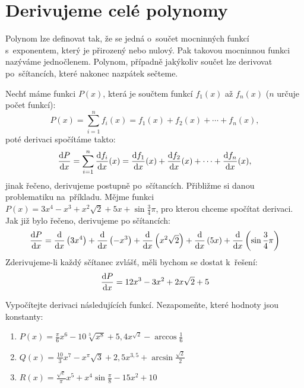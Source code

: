 \section{Derivujeme celé polynomy}
\label{sec:derivace-polynomy}

Polynom lze definovat tak, že se jedná o~součet mocninných funkcí s~exponentem, který
je přirozený nebo nulový. Pak takovou mocninnou funkci nazýváme jednočlenem. Polynom,
případně jakýkoliv součet lze derivovat po~sčítancích, které nakonec nazpátek
sečteme.

Nechť máme funkci $P(x)$, která je součtem funkcí $f_1(x)$ až $f_n(x)$ ($n$ určuje počet funkcí):
\begin{equation*}
    P(x) = \sum_{i = 1}^n f_i(x) = f_1(x) + f_2(x) + \cdots + f_n(x),
\end{equation*}
poté derivaci spočítáme takto:
\begin{equation*}
    \frac{\mathrm{d}P}{\mathrm{d} x} = \sum_{i = 1}^n \frac{\mathrm{d}f_i}{\mathrm{d} x}(x)
    = \frac{\mathrm{d}f_1}{\mathrm{d} x}(x)
    + \frac{\mathrm{d}f_2}{\mathrm{d} x}(x)
    + \cdots + \frac{\mathrm{d}f_n}{\mathrm{d} x}(x),
\end{equation*}
jinak řečeno, derivujeme postupně po~sčítancích. Přibližme si danou problematiku na~příkladu. Mějme funkci $P(x) = 3x^4 - x^3 + x^2 \sqrt2 + 5x + \sin \frac34 \pi$, pro kterou chceme spočítat derivaci. Jak již bylo řečeno, derivujeme po sčítancích:
\begin{equation*}
    \frac{\mathrm{d}P}{\mathrm{d} x}
    = \frac{\mathrm{d}}{\mathrm{d} x} \left( 3x^4 \right)
    + \frac{\mathrm{d}}{\mathrm{d} x} \left( -x^3 \right)
    + \frac{\mathrm{d}}{\mathrm{d} x} \left( x^2 \sqrt2 \right)
    + \frac{\mathrm{d}}{\mathrm{d} x} \left( 5x \right)
    + \frac{\mathrm{d}}{\mathrm{d} x} \left( \sin \frac34 \pi \right)
\end{equation*}
Zderivujeme-li každý sčítanec zvlášť, měli bychom se dostat k~řešení:
\begin{equation*}
    \frac{\mathrm{d}P}{\mathrm{d} x} = 12x^3 - 3x^2 + 2x \sqrt2 + 5
\end{equation*}

\begin{exercise}
    Vypočítejte derivaci následujících funkcí. Nezapomeňte, které hodnoty jsou konstanty:
    \begin{enumerate}
        \item $\displaystyle P(x)
        = \frac{\pi}{6} x^6 - 10\sqrt[3]{x^8} + 5,4x^{\sqrt2} - \arccos \frac{1}{6}$
        \item $\displaystyle Q(x)
        = \frac{10}{3} x^7 - x^\pi \sqrt3 + 2,5x^{3,5} + \arcsin \frac{\sqrt2}{2}$
        \item $\displaystyle R(x)
        = \frac{\sqrt{e}}{\pi} x^5 + x^4 \sin \frac{\pi}{8} - 15x^2 + 10$
    \end{enumerate}
\end{exercise}
